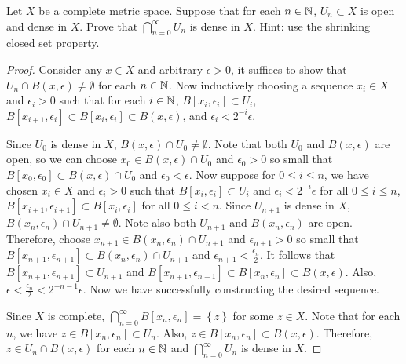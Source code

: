 \documentclass[a4paper]{article}
\begin{document}
\begin{thm}
  Let $X$ be a complete metric space.  Suppose that for each
  $n \in \mathbb{N}$, $U_n \subset X$ is open and dense in $X$.
  Prove that $\bigcap_{n=0}^\infty U_n$ is dense in $X$.
  Hint: use the shrinking closed set property.
\end{thm}

\begin{proof}
  Consider any $x \in X$ and arbitrary $\epsilon > 0$, it suffices to show
  that $U_n \cap B(x, \epsilon) \neq \emptyset$ for each $n \in \mathbb{N}$. Now
  inductively choosing a sequence $x_i \in X$ and $\epsilon_i > 0$ such
  that for each $i \in \mathbb{N}$, $B[x_i, \epsilon_i] \subset U_i$, $B[x_{i+1},
        \epsilon_i] \subset B[x_i, \epsilon_i] \subset B(x, \epsilon)$, and
  $\epsilon_i < 2^{-i} \epsilon$.

  Since $U_0$ is dense in $X$, $B(x, \epsilon) \cap U_0 \neq \emptyset$.
  Note that both $U_0$ and $B(x, \epsilon)$ are open, so we can choose
  $x_0 \in B(x, \epsilon) \cap U_0$ and $\epsilon_0 > 0$ so small that
  $B[x_0, \epsilon_0] \subset B(x, \epsilon) \cap U_0$ and $\epsilon_0 <
  \epsilon$. Now suppose for $0 \leq i \leq n$, we have chosen $x_i \in X$
  and $\epsilon_i > 0$ such that $B[x_i, \epsilon_i] \subset U_i$ and
  $\epsilon_i < 2^{-i} \epsilon$ for all $0 \leq i \leq n$, $B[x_{i+1},
  \epsilon_{i+1}] \subset B[x_i, \epsilon_i]$ for all $0 \leq i < n$.
  Since $U_{n+1}$ is dense in $X$, $B(x_n, \epsilon_n) \cap U_{n+1} \neq
  \emptyset$. Note also both $U_{n+1}$ and $B(x_n, \epsilon_n)$ are open.
  Therefore, choose $x_{n+1} \in B(x_n, \epsilon_n) \cap U_{n+1}$ and
  $\epsilon_{n+1} > 0$ so small that $B[x_{n+1}, \epsilon_{n+1}] \subset
  B(x_n, \epsilon_n) \cap U_{n+1}$ and $\epsilon_{n+1} <
  \frac{\epsilon_n}{2}$. It follows that $B[x_{n+1}, \epsilon_{n+1}]
  \subset U_{n+1}$ and $B[x_{n+1}, \epsilon_{n+1}] \subset B[x_n,
  \epsilon_n] \subset B(x, \epsilon)$. Also, $\epsilon <
  \frac{\epsilon_n}{2} < 2^{-n-1} \epsilon$. Now we have successfully
  constructing the desired sequence.

  Since $X$ is complete, $\bigcap_{n=0}^\infty B[x_n, \epsilon_n] =
  \left\{ z \right\}$ for some $z \in X$. Note that for each $n$, we have
  $z \in B[x_n, \epsilon_n] \subset U_n$. Also, $z \in B[x_n, \epsilon_n]
  \subset B(x, \epsilon)$. Therefore, $z \in U_n \cap B(x, \epsilon)$ for
  each $n \in \mathbb{N}$ and $\bigcap_{n=0}^\infty U_n$ is dense in $X$.

\end{proof}
\end{document}
